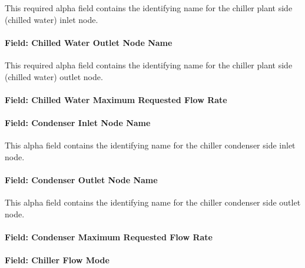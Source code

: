 This required alpha field contains the identifying name for the chiller plant side (chilled water) inlet node.

\paragraph{Field: Chilled Water Outlet Node Name}\label{field-chiller205-chilled-water-outlet-node-name}

This required alpha field contains the identifying name for the chiller plant side (chilled water) outlet node.

\paragraph{Field: Chilled Water Maximum Requested Flow Rate}\label{field-chiller205-chilled-water-maximum-requested-flow-rate}

\paragraph{Field: Condenser Inlet Node Name}\label{field-chiller205-condenser-inlet-node-name}

This alpha field contains the identifying name for the chiller condenser side inlet node.

\paragraph{Field: Condenser Outlet Node Name}\label{field-chiller205-condenser-outlet-node-name}

This alpha field contains the identifying name for the chiller condenser side outlet node.

\paragraph{Field: Condenser Maximum Requested Flow Rate}\label{field-chiller205-condenser-maximum-requested-flow-rate}

\paragraph{Field: Chiller Flow Mode}\label{field-chiller205-chiller-flow-mode}

